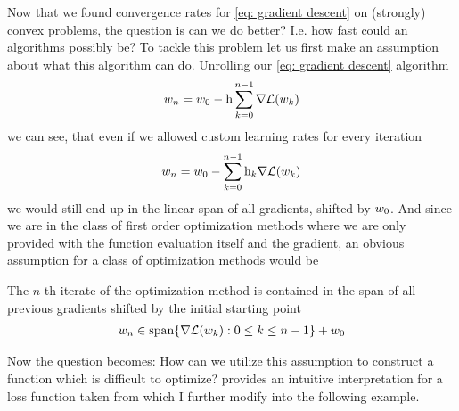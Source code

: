 Now that we found convergence rates for \ref{eq: gradient descent} on (strongly) convex
problems, the question is can we do better? I.e. how fast could an algorithms
possibly be? To tackle this problem let us first make an assumption about what
this algorithm can do. Unrolling our \ref{eq: gradient descent} algorithm
%
\begin{align*}
	w_n = w_0 - \text{h}\sum_{k=0}^{n-1} \nabla \mathcal{L}(w_k)
\end{align*}
%
we can see, that even if we allowed custom learning rates for every iteration
%
\begin{align*}
	w_n = w_0 - \sum_{k=0}^{n-1} \text{h}_k \nabla \mathcal{L}(w_k)
\end{align*}
%
we would still end up in the linear span of all gradients, shifted by \(w_0\).
And since we are in the class of first order optimization methods where we are
only provided with the function evaluation itself and the gradient, an obvious
assumption for a class of optimization methods would be
%
\begin{assumption}
	\label{assmpt: parameter in linear hull of gradients}
	The \(n\)-th iterate of the optimization method is contained in the span of all
	previous gradients shifted by the initial starting point
	\begin{align*}
		w_n \in \text{span}\{\nabla \mathcal{L}(w_k) : 0\le k \le n-1\} + w_0
	\end{align*}
\end{assumption}
%
Now the question becomes: How can we utilize this assumption to construct a
function which is difficult to optimize?
\textcite{gohWhyMomentumReally2017} provides an intuitive interpretation for a loss
function taken from \textcite[Section 2.1.2]{nesterovLecturesConvexOptimization2018}
which I further modify into the following example.

